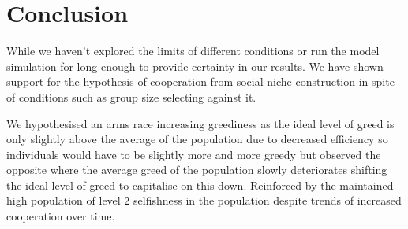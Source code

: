 \documentclass[a4paper,10pt, twocolumn]{article}
\begin{document}
\section{Conclusion}


While we haven't explored the limits of different conditions or run the model simulation for long enough to provide certainty in our results. We have shown support for the hypothesis of cooperation from social niche construction in spite of conditions such as group size selecting against it. 

We hypothesised an arms race increasing greediness as the ideal level of greed is only slightly above the average of the population due to decreased efficiency so individuals would have to be slightly more and more greedy  but observed the opposite where the average greed of the population slowly deteriorates shifting the ideal level of greed to capitalise on this down. Reinforced by the maintained high population of level 2 selfishness in the population despite trends of increased cooperation over time. 
\end{document}
